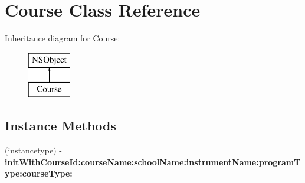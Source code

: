 \hypertarget{interface_course}{\section{Course Class Reference}
\label{interface_course}
}
Inheritance diagram for Course\+:\begin{figure}[H]
\begin{center}
\leavevmode
\includegraphics[height=2.000000cm]{interface_course}
\end{center}
\end{figure}
\subsection*{Instance Methods}
\begin{DoxyCompactItemize}
\item 
\hypertarget{interface_course_a1047820e29b5f4aae53c3a161824823d}{(instancetype) -\/ {\bfseries init\+With\+Course\+Id\+:course\+Name\+:school\+Name\+:instrument\+Name\+:program\+Type\+:course\+Type\+:}}\label{interface_course_a1047820e29b5f4aae53c3a161824823d}

\end{DoxyCompactItemize}
